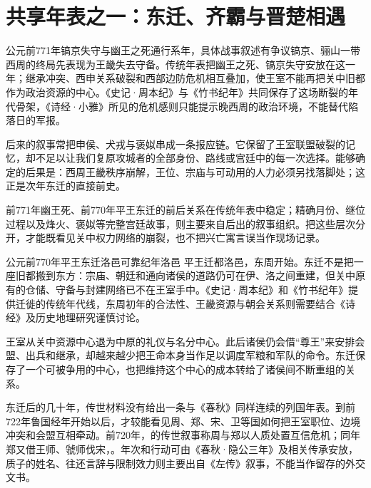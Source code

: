 \section{共享年表之一：东迁、齐霸与晋楚相遇}

\begin{event}{公元前771年}{镐京失守与幽王之死}{通行系年，具体战事叙述有争议}{镐京、骊山一带}
西周的终局先表现为王畿失去守备。传统年表把幽王之死、镐京失守安放在这一年；继承冲突、西申关系破裂和西部边防危机相互叠加，使王室不能再把关中旧都作为政治资源的中心。《史记·周本纪》与《竹书纪年》共同保存了这场断裂的年代骨架，《诗经·小雅》所见的危机感则只能提示晚西周的政治环境，不能替代陷落日的军报。

后来的叙事常把申侯、犬戎与褒姒串成一条报应链。它保留了王室联盟破裂的记忆，却不足以让我们复原攻城者的全部身份、路线或宫廷中的每一次选择。能够确定的后果是：西周王畿秩序崩解，王位、宗庙与可动用的人力必须另找落脚处；这正是次年东迁的直接前史。
\end{event}

\begin{sourcenote}
前771年幽王死、前770年平王东迁的前后关系在传统年表中稳定；精确月份、继位过程以及烽火、褒姒等完整宫廷故事，则主要来自后出的叙事组织。把这些层次分开，才能既看见关中权力网络的崩裂，也不把兴亡寓言误当作现场记录。
\end{sourcenote}

\begin{event}{公元前770年}{平王东迁洛邑}{可靠纪年}{洛邑}
平王迁都洛邑，东周开始。东迁不是把一座旧都搬到东方：宗庙、朝廷和通向诸侯的道路仍可在伊、洛之间重建，但关中原有的仓储、守备与封建网络已不在王室手中。《史记·周本纪》和《竹书纪年》提供迁徙的传统年代线，东周初年的合法性、王畿资源与朝会关系则需要结合《诗经》及历史地理研究谨慎讨论。

王室从关中资源中心退为中原的礼仪与名分中心。此后诸侯仍会借“尊王”来安排会盟、出兵和继承，却越来越少把王命本身当作足以调度军粮和军队的命令。东迁保存了一个可被争用的中心，也把维持这个中心的成本转给了诸侯间不断重组的关系。
\end{event}

东迁后的几十年，传世材料没有给出一条与《春秋》同样连续的列国年表。到前722年鲁国经年开始以后，才较能看见周、郑、宋、卫等国如何把王室职位、边境冲突和会盟互相牵动。前720年，的传世叙事称周与郑以人质处置互信危机；同年郑又借王师、虢师伐宋，。年次和行动可由《春秋·隐公三年》及相关传承安放，质子的姓名、往还言辞与限制效力则主要出自《左传》叙事，不能当作留存的外交文书。

